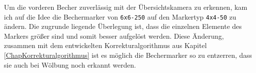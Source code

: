     Um die vorderen Becher zuverlässig mit der Übersichtskamera zu erkennen, kam ich auf die Idee die Bechermarker von \verb|6x6-250| auf den Markertyp \verb|4x4-50| zu ändern.
    Die zugrunde liegende Überlegung ist, dass die einzelnen Elemente des Markers größer sind und somit besser aufgelöst werden. 
    Diese Änderung, zusammen mit dem entwickelten Korrekturalgorithmus aus Kapitel \ref{ChapKorrekturalgorithmus} ist es möglich die Bechermarker so zu entzerren, dass sie auch bei Wölbung noch erkannt werden.

